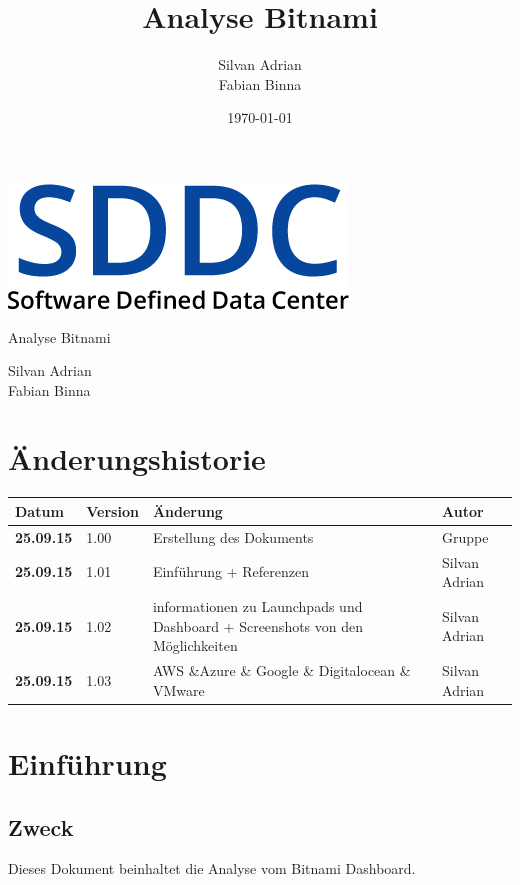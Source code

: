 \documentclass[11pt]{scrartcl}
\title{Analyse Bitnami}
\author{Silvan Adrian \\ Fabian Binna}
\date{\today{}}
\begin{document}
\def\arraystretch{1.5}
\begin{titlepage}
\begin{center}
\vspace{10em}
\includegraphics[scale=2]{SDDC}
\vspace{10em}
\end{center}
\begin{center}
\huge {Analyse Bitnami}
\end{center}
\begin{center}
\vspace{10em}
\LARGE {Silvan Adrian} \\
\LARGE {Fabian Binna}
\end{center}

\end{titlepage}

\newpage
\section{Änderungshistorie}
\begin{tabularx}{\linewidth}{l l X l}
\textbf{Datum} & \textbf{Version} & \textbf{Änderung}  & \textbf{Autor} \\
\hline
\textbf{25.09.15} & 1.00 & Erstellung des Dokuments & Gruppe \\
\textbf{25.09.15} & 1.01 & Einführung + Referenzen & Silvan Adrian \\
\textbf{25.09.15} & 1.02 & informationen zu Launchpads und Dashboard + 
Screenshots von den Möglichkeiten & Silvan Adrian \\
\textbf{25.09.15} & 1.03 & AWS \&Azure \& Google \& Digitalocean \& VMware & 
Silvan Adrian\\
\end{tabularx}

\newpage
\tableofcontents
\newpage

\section{Einführung}
\subsection{Zweck}
Dieses Dokument beinhaltet die Analyse vom Bitnami Dashboard.
\end{document}
